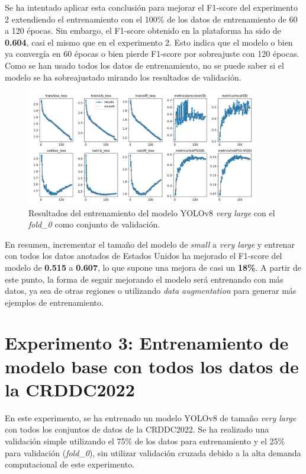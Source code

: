 Se ha intentado aplicar esta conclusión para mejorar el F1-score del experimento 2 extendiendo el entrenamiento con el 100\% de los datos de entrenamiento de 60 a 120 épocas. Sin embargo, el F1-score obtenido en la plataforma ha sido de \textbf{0.604}, casi el mismo que en el experimento 2. Esto indica que el modelo o bien ya convergía en 60 épocas o bien pierde F1-score por sobreajuste con 120 épocas. Como se han usado todos los datos de entrenamiento, no se puede saber si el modelo se ha sobreajustado mirando los resultados de validación.

\begin{figure}
    \centering
    \includegraphics[width=0.9\textwidth]{img/exp2b-results.png}
    \caption{Resultados del entrenamiento del modelo YOLOv8 \textit{very large} con el \textit{fold\_0} como conjunto de validación.}
    \label{fig:exp2b-results}
\end{figure}

En resumen, incrementar el tamaño del modelo de \textit{small} a \textit{very large} y entrenar con todos los datos anotados de Estados Unidos ha mejorado el F1-score del modelo de \textbf{0.515} a \textbf{0.607}, lo que supone una mejora de casi un \textbf{18\%}. A partir de este punto, la forma de seguir mejorando el modelo será entrenando con más datos, ya sea de otras regiones o utilizando \textit{data augmentation} para generar más ejemplos de entrenamiento.

\section{Experimento 3: Entrenamiento de modelo base con todos los datos de la CRDDC2022}\label{SEC:EXP3}

En este experimento, se ha entrenado un modelo YOLOv8 de tamaño \textit{very large} con todos los conjuntos de datos de la CRDDC2022. Se ha realizado una validación simple utilizando el 75\% de los datos para entrenamiento y el 25\% para validación (\textit{fold\_0}), sin utilizar validación cruzada debido a la alta demanda computacional de este experimento.

